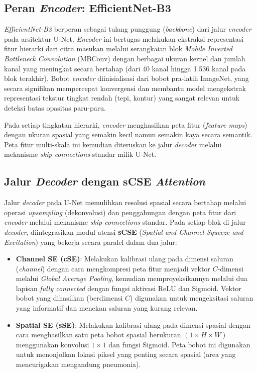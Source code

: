 \documentclass[12pt,a4paper,oneside]{book}
\begin{document}
\subsection{Peran \textit{Encoder}: EfficientNet-B3}

\textit{EfficientNet-B3} berperan sebagai tulang punggung (\textit{backbone}) dari jalur \textit{encoder} pada arsitektur U-Net. \textit{Encoder} ini bertugas melakukan ekstraksi representasi fitur hierarki dari citra masukan melalui serangkaian blok \textit{Mobile Inverted Bottleneck Convolution} (MBConv) dengan berbagai ukuran kernel dan jumlah kanal yang meningkat secara bertahap (dari 40 kanal hingga 1.536 kanal pada blok terakhir). Bobot \textit{encoder} diinisialisasi dari bobot pra-latih ImageNet, yang secara signifikan mempercepat konvergensi dan membantu model mengekstrak representasi tekstur tingkat rendah (tepi, kontur) yang sangat relevan untuk deteksi batas opasitas paru-paru.

Pada setiap tingkatan hierarki, \textit{encoder} menghasilkan peta fitur (\textit{feature maps}) dengan ukuran spasial yang semakin kecil namun semakin kaya secara semantik. Peta fitur multi-skala ini kemudian diteruskan ke jalur \textit{decoder} melalui mekanisme \textit{skip connections} standar milik U-Net.

\subsection{Jalur \textit{Decoder} dengan sCSE \textit{Attention}}

Jalur \textit{decoder} pada U-Net memulihkan resolusi spasial secara bertahap melalui operasi \textit{upsampling} (dekonvolusi) dan penggabungan dengan peta fitur dari \textit{encoder} melalui mekanisme \textit{skip connections} standar. Pada setiap blok di jalur \textit{decoder}, diintegrasikan modul atensi \textbf{sCSE} (\textit{Spatial and Channel Squeeze-and-Excitation}) yang bekerja secara paralel dalam dua jalur:

\begin{itemize}
  \item \textbf{Channel SE (cSE)}: Melakukan kalibrasi ulang pada dimensi saluran (\textit{channel}) dengan cara mengkompresi peta fitur menjadi vektor $C$-dimensi melalui \textit{Global Average Pooling}, kemudian memproyeksikannya melalui dua lapisan \textit{fully connected} dengan fungsi aktivasi ReLU dan Sigmoid. Vektor bobot yang dihasilkan (berdimensi $C$) digunakan untuk mengeksitasi saluran yang informatif dan menekan saluran yang kurang relevan.
  \item \textbf{Spatial SE (sSE)}: Melakukan kalibrasi ulang pada dimensi spasial dengan cara menghasilkan satu peta bobot spasial berukuran $(1 \times H \times W)$ menggunakan konvolusi $1 \times 1$ dan fungsi Sigmoid. Peta bobot ini digunakan untuk menonjolkan lokasi piksel yang penting secara spasial (area yang mencurigakan mengandung pneumonia).
\end{itemize}
\end{document}
